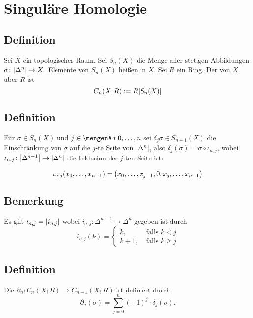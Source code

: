 \section{Singuläre Homologie} %
\label{sec:5}

\subsection[Definition: Singuläre Simplizes und $n$-ter singulärer Kettenmodul]{Definition} %
\label{sub:51}
Sei $X$ ein topologischer Raum. Sei $S_n(X)$ die Menge aller stetigen Abbildungen $\sigma \colon \abs*{\Delta^n} \to X$. Elemente von $S_n(X)$ heißen  
in $X$. Sei $R$ ein Ring. Der  von $X$ über $R$ ist
\[
	C_n(X;R) := R \benbrace*{S_n(X)} 
\] 


\subsection[Definition: Einschränkung eines singulären Simplizes auf eine Seite]{Definition} %
\label{sub:52}
Für $\sigma \in S_n(X)$ und $j \in \set{0,\ldots ,n}$ sei $\delta_j \sigma \in S_{n-1}(X)$ die Einschränkung von $\sigma$ auf die $j$-te Seite von $\abs*{\Delta^n}$,
also $\delta_j(\sigma) = \sigma \circ \iota_{n,j}$, wobei $\iota_{n,j} \colon \abs*{\Delta^{n-1}} \to \abs*{\Delta^n}$ die Inklusion der $j$-ten Seite ist:

\[
	\iota_{n,j}(x_0, \ldots ,x_{n-1}) = \enbrace[\big]{x_0, \ldots , x_{j-1}, 0, x_j, \ldots , x_{n-1}}
\]

\subsection[Bemerkung zur Inklusion der $j$-ten Seite]{Bemerkung} %
\label{sub:53}
Es gilt $\iota_{n,j} = \abs*{i_{n,j}}$ wobei $i_{n,j} \colon \Delta^{n-1} \to \Delta^n$ gegeben ist durch 
\[
	i_{n,j}(k) = \begin{cases}
	k, &\text{ falls }k < j\\
	k+1, &\text{ falls } k\ge j
\end{cases}
\]

\subsection[Definition: $n$-te singuläre Randabbildung]{Definition} %
\label{sub:54}
Die  $\partial_n \colon C_n(X;R) \to C_{n-1}(X;R)$ ist 
definiert durch 
\[
	\partial_n(\sigma) = \sum_{j=0}^{n} (-1)^j \cdot \delta_j(\sigma).
\]

